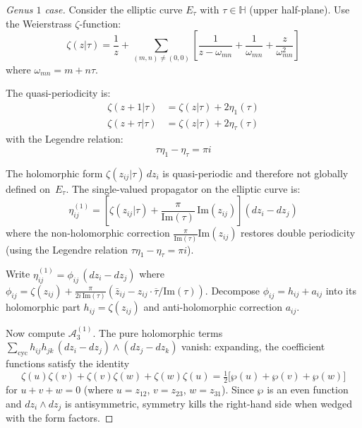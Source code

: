 \begin{proof}[Genus $1$ case]
Consider the elliptic curve $E_\tau$ with $\tau \in \mathbb{H}$ (upper half-plane). Use the Weierstrass $\zeta$-function:
\begin{equation}
\zeta(z|\tau) = \frac{1}{z} + \sum_{(m,n) \neq (0,0)} \left[\frac{1}{z - \omega_{mn}} + \frac{1}{\omega_{mn}} + \frac{z}{\omega_{mn}^2}\right]
\end{equation}
where $\omega_{mn} = m + n\tau$.

The quasi-periodicity is:
\begin{align}
\zeta(z + 1|\tau) &= \zeta(z|\tau) + 2\eta_1(\tau)\\
\zeta(z + \tau|\tau) &= \zeta(z|\tau) + 2\eta_\tau(\tau)
\end{align}
with the Legendre relation:
\begin{equation}
\tau \eta_1 - \eta_\tau = \pi i
\end{equation}

The holomorphic form $\zeta(z_{ij}|\tau)\,dz_i$ is quasi-periodic and therefore not globally defined on~$E_\tau$.  The single-valued propagator on the elliptic curve is:
\begin{equation}\label{eq:genus-1-propagator-full}
\eta_{ij}^{(1)} = \left[\zeta(z_{ij}|\tau) + \frac{\pi}{\mathrm{Im}(\tau)}\,\mathrm{Im}(z_{ij})\right](dz_i - dz_j)
\end{equation}
where the non-holomorphic correction $\frac{\pi}{\mathrm{Im}(\tau)}\mathrm{Im}(z_{ij})$ restores double periodicity (using the Legendre relation $\tau\eta_1 - \eta_\tau = \pi i$).

Write $\eta_{ij}^{(1)} = \phi_{ij}\,(dz_i - dz_j)$ where $\phi_{ij} = \zeta(z_{ij}) + \frac{\pi}{2i\,\mathrm{Im}(\tau)}(\bar{z}_{ij} - z_{ij} \cdot \overline{\tau}/\mathrm{Im}(\tau))$.  Decompose $\phi_{ij} = h_{ij} + a_{ij}$ into its holomorphic part $h_{ij} = \zeta(z_{ij})$ and anti-holomorphic correction $a_{ij}$.

Now compute $\mathcal{A}_3^{(1)}$.  The pure holomorphic terms $\sum_{\mathrm{cyc}} h_{ij}h_{jk}\,(dz_i - dz_j)\wedge(dz_j - dz_k)$ vanish: expanding, the coefficient functions satisfy the identity
\begin{equation}
\zeta(u)\zeta(v) + \zeta(v)\zeta(w) + \zeta(w)\zeta(u) = \tfrac{1}{2}\bigl[\wp(u) + \wp(v) + \wp(w)\bigr]
\end{equation}
for $u+v+w = 0$ (where $u = z_{12}$, $v = z_{23}$, $w = z_{31}$).  Since $\wp$ is an even function and $dz_i \wedge dz_j$ is antisymmetric, symmetry kills the right-hand side when wedged with the form factors.


\end{proof}
